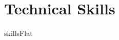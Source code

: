 \section{Technical Skills}
\begin{itemize}[leftmargin=0.15in, label={}]
    \small{\item{{ {{skillsFlat}} }
    }}
\end{itemize}
\vspace{-16pt}
